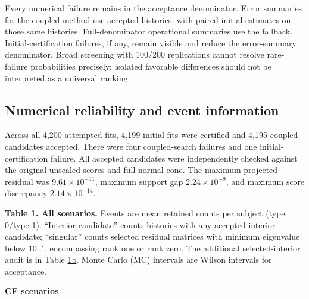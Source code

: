 \documentclass[11pt]{article}
\begin{document}
Every numerical failure remains in the acceptance denominator. Error summaries for the coupled method use accepted histories, with paired initial estimates on those same histories. Full-denominator operational summaries use the fallback. Initial-certification failures, if any, remain visible and reduce the error-summary denominator. Broad screening with 100/200 replications cannot resolve rare-failure probabilities precisely; isolated favorable differences should not be interpreted as a universal ranking.

\subsection{Numerical reliability and event information}\label{sec:6.3}

Across all 4,200 attempted fits, 4,199 initial fits were certified and 4,195 coupled candidates accepted. There were four coupled-search failures and one initial-certification failure. All accepted candidates were independently checked against the original unscaled scores and full normal cone. The maximum projected residual was \(9.61\times10^{-11}\), maximum support gap \(2.24\times10^{-9}\), and maximum score discrepancy \(2.14\times10^{-14}\).

\label{tab:1}
\textbf{Table 1. All scenarios.} Events are mean retained counts per subject (type 0/type 1). ``Interior candidate'' counts histories with any accepted interior candidate; ``singular'' counts selected residual matrices with minimum eigenvalue below \(10^{-7}\), encompassing rank one or rank zero. The additional selected-interior audit is in Table \hyperref[tab:1b]{1b}. Monte Carlo (MC) intervals are Wilson intervals for acceptance.

\textbf{CF scenarios}
\end{document}
